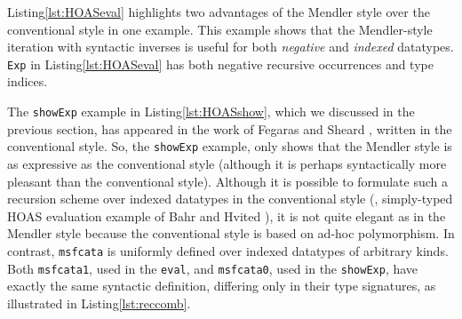 \begin{figure}

\vspace*{-3ex}
\end{figure}

Listing\;\ref{lst:HOASeval} highlights two advantages of the Mendler style over
the conventional style in one example. This example shows that the Mendler-style
iteration with syntactic inverses is useful for both \textit{negative} and
\textit{indexed} datatypes. \lstinline{Exp} in Listing\;\ref{lst:HOASeval} has
both negative recursive occurrences and type indices.

The \lstinline{showExp} example in Listing\;\ref{lst:HOASshow},
which we discussed in the previous section, has appeared in the work
of Fegaras and Sheard \cite{FegShe96}, written in the conventional style.
So, the \lstinline{showExp} example, only shows that the Mendler style is
as expressive as the conventional style (although it is
perhaps syntactically more pleasant than the conventional style).
Although it is possible to formulate such a recursion scheme over
indexed datatypes in the conventional style (\eg, simply-typed HOAS evaluation
example of Bahr and Hvited \cite{BahHvi12}), it is not quite elegant as
in the Mendler style because the conventional style is based on ad-hoc polymorphism.
In contrast, \lstinline{msfcata} is uniformly defined over indexed datatypes of
arbitrary kinds. Both \lstinline{msfcata1}, used in the \lstinline{eval},
and \lstinline{msfcata0}, used in the \lstinline{showExp}, have exactly
the same syntactic definition, differing only in their type signatures,
as illustrated in Listing\;\ref{lst:reccomb}.
